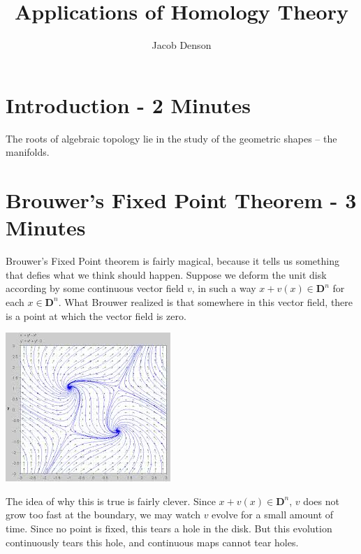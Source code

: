 \documentclass{article}
\title{Applications of Homology Theory}
\author{Jacob Denson}
\theoremstyle{plain}
\begin{document}
\maketitle

\section{Introduction - 2 Minutes}

The roots of algebraic topology lie in the study of the geometric shapes -- the manifolds.

\section{Brouwer's Fixed Point Theorem - 3 Minutes}

Brouwer's Fixed Point theorem is fairly magical, because it tells us something that defies what we think should happen. Suppose we deform the unit disk according by some continuous vector field $v$, in such a way $x + v(x) \in \mathbf{D}^n$ for each $x \in \mathbf{D}^n$. What Brouwer realized is that somewhere in this vector field, there is a point at which the vector field is zero.

\begin{center}
\includegraphics[scale=0.4]{vectorField}
\end{center}


The idea of why this is true is fairly clever. Since $x + v(x) \in \mathbf{D}^n$, $v$ does not grow too fast at the boundary, we may watch $v$ evolve for a small amount of time. Since no point is fixed, this tears a hole in the disk. But this evolution continuously tears this hole, and continuous maps cannot tear holes.
\end{document}
